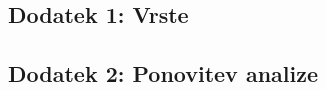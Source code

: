\documentclass{article}
\begin{document}
\begin{multicols}{2}
\subsection{Dodatek 1: Vrste}



\subsection{Dodatek 2: Ponovitev analize}



\end{multicols}
\end{document}
